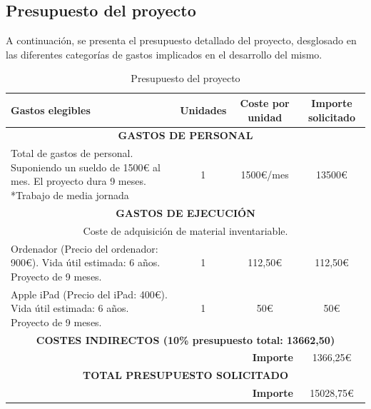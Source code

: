 \subsection{Presupuesto del proyecto}
A continuación, se presenta el presupuesto detallado del proyecto, desglosado en las diferentes categorías de gastos implicados en el desarrollo del mismo.

\begin{table}[H]
\centering
\renewcommand{\arraystretch}{1.3}
\begin{tabularx}{\textwidth}{|X|c|c|c|}
    \hline
    \textbf{Gastos elegibles} & \textbf{Unidades} & \textbf{Coste por unidad} & \textbf{Importe solicitado} \\
    \hline

    \multicolumn{4}{|c|}{\textbf{GASTOS DE PERSONAL}} \\
    \hline
    Total de gastos de personal.  
    \newline \footnotesize *Suponiendo un sueldo de 1500€ al mes.  
    \newline *El proyecto dura 9 meses.
    \newline **Trabajo de media jornada &
    1 &
    1500€/mes &
    13500€ \\
    \hline

    \multicolumn{4}{|c|}{\textbf{GASTOS DE EJECUCIÓN}} \\
    \hline
    \multicolumn{4}{|c|}{Coste de adquisición de material inventariable.} \\
    \hline
    Ordenador (Precio del ordenador: 900€).  
    \newline \footnotesize *Vida útil estimada: 6 años.  
    \newline *Proyecto de 9 meses. &
    1 &
    112,50€ &
    112,50€ \\
    \hline
    Apple iPad (Precio del iPad: 400€).  
    \newline \footnotesize *Vida útil estimada: 6 años.  
    \newline *Proyecto de 9 meses. &
    1 &
    50€ &
    50€ \\
    \hline

    \multicolumn{4}{|c|}{\textbf{COSTES INDIRECTOS (10\% presupuesto total: 13662,50)}} \\
    \hline
    \multicolumn{3}{|r|}{\textbf{Importe}} & 1366,25€ \\
    \hline
    \multicolumn{4}{|c|}{\textbf{TOTAL PRESUPUESTO SOLICITADO}} \\
    \hline
    \multicolumn{3}{|r|}{\textbf{Importe}} & 15028,75€ \\
    \hline
\end{tabularx}
\caption{Presupuesto del proyecto}
\label{tab:presupuesto}
\end{table}

